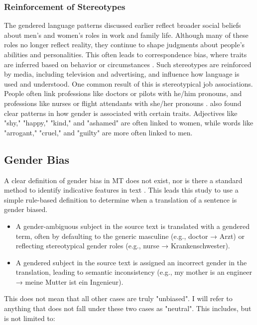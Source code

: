     \subsubsection{Reinforcement of Stereotypes}
        The gendered language patterns discussed earlier reflect broader social beliefs about men’s and women’s roles in work and family life. Although many of these roles no longer reflect reality, they continue to shape judgments about people’s abilities and personalities. This often leads to correspondence bias, where traits are inferred based on behavior or circumstances \parencite{godsilEffectsGenderRoles2016}. Such stereotypes are reinforced by media, including television and advertising, and influence how language is used and understood. One common result of this is stereotypical job associations. People often link professions like doctors or pilots with he/him pronouns, and professions like nurses or flight attendants with she/her pronouns \parencite{shresthaExploringGenderBiases2022}. \textcite{pratesAssessingGenderBias2019} also found clear patterns in how gender is associated with certain traits. Adjectives like "shy," "happy," "kind," and "ashamed" are often linked to women, while words like "arrogant," "cruel," and "guilty" are more often linked to men. 

  
 \subsection{Gender Bias} \label{subsection:definition_gb}
    A clear definition of gender bias in MT does not exist, nor is there a standard method to identify indicative features in text \parencite{barclayInvestigatingMarkersDrivers2024a}. This leads this study to use a simple rule-based definition to determine when a translation of a sentence is gender biased.

        \begin{itemize}
        \item A gender-ambiguous subject in the source text is translated with a gendered term, often by defaulting to the generic masculine (e.g., doctor → Arzt) or reflecting stereotypical gender roles (e.g., nurse → Krankenschwester).
        \item A gendered subject in the source text is assigned an incorrect gender in the translation, leading to semantic inconsistency (e.g., my mother is an engineer → meine Mutter ist ein Ingenieur).
        \end{itemize}

    \noindent This does not mean that all other cases are truly "unbiased". I will refer to anything that does not fall under these two cases as "neutral". This includes, but is not limited to:

